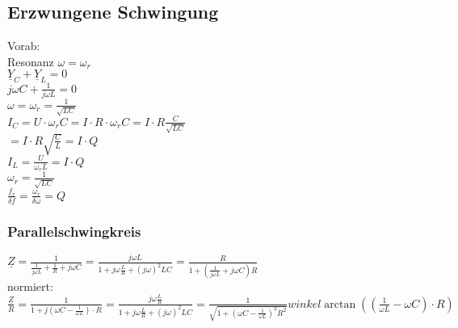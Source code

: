 \subsection{Erzwungene Schwingung}
Vorab:\\ %
Resonanz $\omega=\omega_r$\\
$\underline{Y}_C +\underline{Y}_L = 0$\\
$j\omega C+\frac{1}{j\omega L} = 0$\\
$\omega=\omega_r=\frac{1}{\sqrt{LC}}$\\
$I_C=U\cdot\omega_rC=I\cdot R \cdot \omega_rC=I\cdot R \frac{C}{\sqrt{LC}}$\\
$=I\cdot R \sqrt{\frac{C}{L}} = I \cdot Q$\\
$I_L=\frac{U}{\omega_rL}=I \cdot Q$\\

$\omega_r=\frac{1}{\sqrt{LC}}$\\
$\frac{f_r}{\delta f}=\frac{\omega_r}{\delta \omega} = Q$

\subsubsection{Parallelschwingkreis}
$\underline{Z} = \frac{1}{\frac{1}{j\omega L}+\frac{1}{R} + j \omega C}
= \frac{j\omega L}{1+j\omega \frac{L}{R}+(j\omega)^2LC}
= \frac{R}{1+(\frac{1}{j\omega L}+j\omega C)R}$\\
normiert:\\
$\frac{\underline{Z}}{R}=\frac{1}{1+j(\omega C-\frac{1}{\omega L})\cdot R}
=\frac{j\omega \frac{L}{R}}{1+j\omega\frac{L}{R}+(j\omega)^2LC}
=\frac{1}{\sqrt{1+(\omega C - \frac{1}{\omega
L})^2R^2}} winkel \arctan{((\frac{1}{\omega L}-\omega C)\cdot R)} $\\

